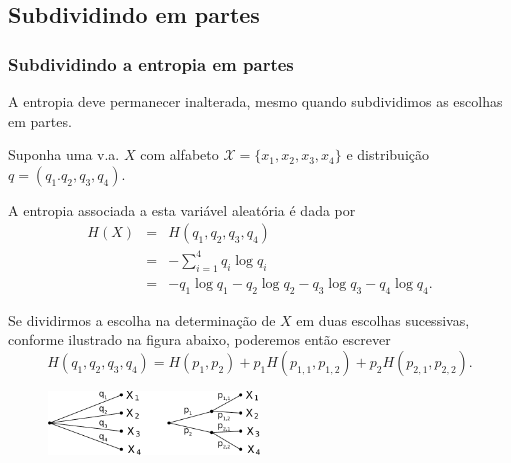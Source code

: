 \subsection{Subdividindo em partes}
\begin{frame}[allowframebreaks]
  \frametitle{Subdividindo a entropia em partes}
  A entropia deve permanecer inalterada, mesmo quando subdividimos as escolhas em partes.
 
  \begin{example}
  Suponha uma v.a. $X$ com alfabeto $\mathcal{X} = \{x_1, x_2, x_3, x_4 \}$
  e distribuição $q = (q_1. q_2, q_3, q_4)$.

  A entropia associada a esta variável aleatória é dada por
  \begin{eqnarray}
  H(X) &=& H(q_1, q_2, q_3, q_4) \nonumber \\
        &=& - \sum_{i=1}^{4} q_i \log q_i \nonumber \\
        &=& - q_1 \log q_1 - q_2 \log q_2 - q_3 \log q_3  - q_4 \log q_4 .
  \end{eqnarray}

  \examplebreak

  Se dividirmos a escolha na determinação de $X$ em duas escolhas sucessivas,
  conforme ilustrado na figura abaixo, poderemos então escrever
  \begin{equation}
  H(q_1, q_2, q_3, q_4) = H(p_1, p_2) + p_1 H(p_{1,1}, p_{1,2}) + p_2 H(p_{2,1},p_{2,2}) .
  \end{equation}

        \begin{figure}[h!]
        \centering
        \includegraphics[width=0.5\textwidth]{images/choices4.pdf}
        \label{fig:choices4}
        \end{figure}


\end{example}
\end{frame}
